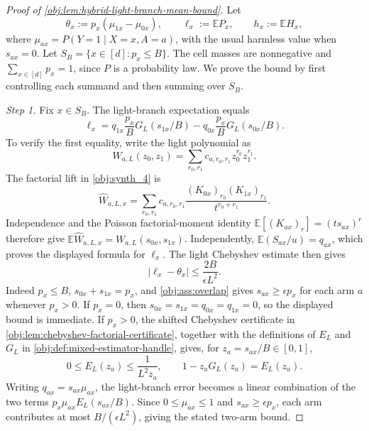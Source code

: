 \documentclass[11pt]{article}
\begin{document}
\begin{proof}[Proof of \cref{obj:lem:hybrid-light-branch-mean-bound}]
Let
\[
\theta_x:=p_x(\mu_{1x}-\mu_{0x}),\qquad
\ell_x:=\mathbb E P_x,\qquad
h_x:=\mathbb E H_x,
\]
where \(\mu_{ax}=P(Y=1\mid X=x,A=a)\), with the usual harmless value when
\(s_{ax}=0\). Let \(S_B=\{x\in[d]:p_x\le B\}\). The cell masses are nonnegative and
\(\sum_{x\in[d]}p_x=1\), since \(P\) is a probability law. We prove the bound by first controlling
each summand and then summing over \(S_B\). %

\emph{Step 1.} Fix \(x\in S_B\). The light-branch expectation equals
\[
\ell_x
=
q_{1x}\frac{p_x}{B}G_L(s_{1x}/B)
-
q_{0x}\frac{p_x}{B}G_L(s_{0x}/B).
\]
To verify the first equality, write the light polynomial as
\[
W_{a,L}(z_0,z_1)=\sum_{r_0,r_1}c_{a,r_0,r_1}z_0^{r_0}z_1^{r_1}.
\]
The factorial lift in \cref{obj:synth_4} is
\[
\widehat W_{a,L,x}
=\sum_{r_0,r_1}c_{a,r_0,r_1}
\frac{(K_{0x})_{r_0}(K_{1x})_{r_1}}{t^{r_0+r_1}}.
\]
Independence and the Poisson factorial-moment identity
\(\mathbb E[(K_{ax})_r]=(ts_{ax})^r\) therefore give
\(\mathbb E\widehat W_{a,L,x}=W_{a,L}(s_{0x},s_{1x})\).  Independently,
\(\mathbb E(S_{ax}/u)=q_{ax}\), which proves the displayed formula for \(\ell_x\).
The light Chebyshev estimate then gives
\[
|\ell_x-\theta_x|
\le
\frac{2B}{\epsilon L^2}.
\]
Indeed \(p_x\le B\), \(s_{0x}+s_{1x}=p_x\), and \cref{obj:ass:overlap} gives
\(s_{ax}\ge \epsilon p_x\) for each arm \(a\) whenever \(p_x>0\). If \(p_x=0\),
then \(s_{0x}=s_{1x}=q_{0x}=q_{1x}=0\), so the displayed bound is immediate. If \(p_x>0\), the
shifted Chebyshev certificate in \cref{obj:lem:chebyshev-factorial-certificate}, together with the
definitions of \(E_L\) and \(G_L\) in \cref{obj:def:mixed-estimator-handle}, gives, for
\(z_a=s_{ax}/B\in[0,1]\),
\[
0\le E_L(z_a)\le \frac{1}{L^2z_a},
\qquad
1-z_aG_L(z_a)=E_L(z_a).
\]
Writing \(q_{ax}=s_{ax}\mu_{ax}\), the light-branch error becomes a linear combination of the two
terms \(p_x\mu_{ax}E_L(s_{ax}/B)\). Since \(0\le\mu_{ax}\le1\) and
\(s_{ax}\ge\epsilon p_x\), each arm contributes at most \(B/(\epsilon L^2)\), giving the stated
two-arm bound. %


\end{proof}
\end{document}
